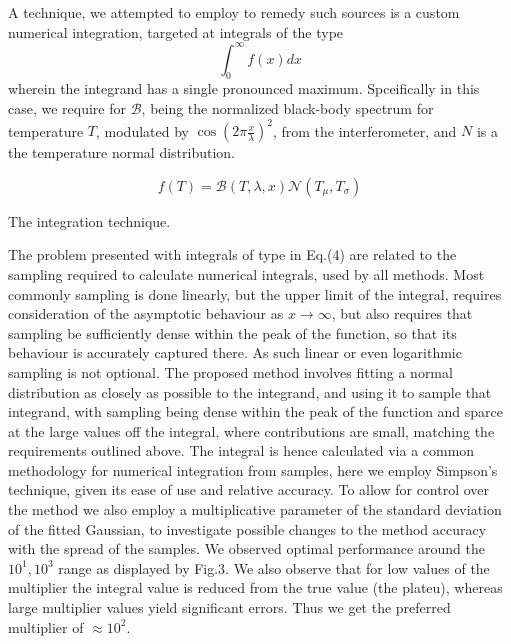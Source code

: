 \documentclass[12pt]{article}
\newenvironment{aside}
  {\begin{mdframed}[style=0,%
      leftline=false,rightline=false,leftmargin=2em,rightmargin=2em,%
          innerleftmargin=0pt,innerrightmargin=0pt,linewidth=0.75pt,%
      skipabove=7pt,skipbelow=7pt]\small}
  {\end{mdframed}}
\begin{document}
        A technique, we attempted to employ to remedy such sources is a custom 
        numerical integration, targeted at integrals of the type 
        \begin{equation}
            \int_0^\infty f(x)dx
        \end{equation}
        wherein the integrand has a single pronounced maximum. Spceifically in this case, 
        we require for $\mathscr{B}$, being the normalized black-body spectrum
        for temperature $T$, modulated by $\cos(2\pi\frac{x}{\lambda})^2$, from the interferometer,
        and $N$ is a the temperature normal distribution.

        \begin{equation}
            f(T) = \mathscr{B}(T, \lambda, x)\mathscr{N}(T_\mu, T_\sigma)
        \end{equation}
    \begin{aside}
        The integration technique.

        The problem presented with integrals of type in Eq.(4) are related to 
        the sampling required to calculate numerical integrals, used by all methods.
        Most commonly sampling is done linearly, but the upper limit of the integral, 
        requires consideration of the asymptotic behaviour as $x \rightarrow \infty$,
        but also requires that sampling be sufficiently dense within the peak of the function,
        so that its behaviour is accurately captured there. As such linear or even logarithmic
        sampling is not optional. The proposed method involves fitting a normal distribution
        as closely as possible to the integrand, and using it to sample that integrand, with
        sampling being dense within the peak of the function and sparce at the large values off
        the integral, where contributions are small, matching the requirements outlined above.
        The integral is hence calculated via a common methodology for numerical integration
        from samples, here we employ Simpson's technique, given its ease of use
        and relative accuracy. To allow for control over the method we also employ a 
        multiplicative parameter of the standard deviation of the fitted Gaussian, to 
        investigate possible changes to the method accuracy with the spread of the samples. We observed 
        optimal performance around the $10^1, 10^3$ range as displayed by Fig.3. We also observe
        that for low values of the multiplier the integral value is reduced from the true value (the plateu),
        whereas large multiplier values yield significant errors. Thus we get the preferred multiplier of $\approx 10^2$.

    \end{aside}
\end{document}
